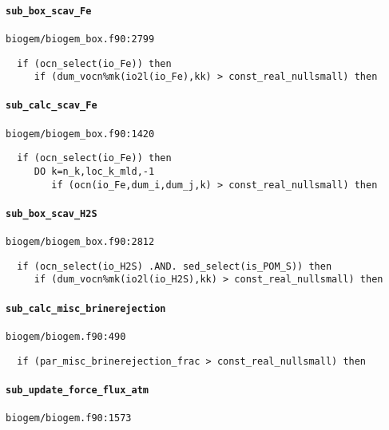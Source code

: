 \documentclass[a4paper,10pt,article]{memoir}
\begin{document}
\paragraph{\texttt{sub\_box\_scav\_Fe}}

\texttt{biogem/biogem\_box.f90:2799}

\begin{verbatim}
  if (ocn_select(io_Fe)) then
     if (dum_vocn%mk(io2l(io_Fe),kk) > const_real_nullsmall) then
\end{verbatim}

\paragraph{\texttt{sub\_calc\_scav\_Fe}}

\texttt{biogem/biogem\_box.f90:1420}

\begin{verbatim}
  if (ocn_select(io_Fe)) then
     DO k=n_k,loc_k_mld,-1
        if (ocn(io_Fe,dum_i,dum_j,k) > const_real_nullsmall) then
\end{verbatim}

\paragraph{\texttt{sub\_box\_scav\_H2S}}

\texttt{biogem/biogem\_box.f90:2812}

\begin{verbatim}
  if (ocn_select(io_H2S) .AND. sed_select(is_POM_S)) then
     if (dum_vocn%mk(io2l(io_H2S),kk) > const_real_nullsmall) then
\end{verbatim}

\paragraph{\texttt{sub\_calc\_misc\_brinerejection}}

\texttt{biogem/biogem.f90:490}

\begin{verbatim}
  if (par_misc_brinerejection_frac > const_real_nullsmall) then
\end{verbatim}

\paragraph{\texttt{sub\_update\_force\_flux\_atm}}

\texttt{biogem/biogem.f90:1573}
\end{document}
